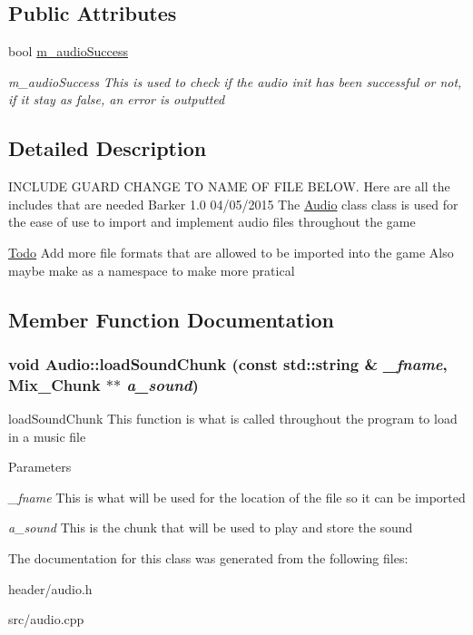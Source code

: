 \subsection*{Public Attributes}
\begin{DoxyCompactItemize}
\item 
\hypertarget{classAudio_a5ce8acaf6d5803f16478dc6aad900eb6}{
bool \hyperlink{classAudio_a5ce8acaf6d5803f16478dc6aad900eb6}{m\_\-audioSuccess}}
\label{classAudio_a5ce8acaf6d5803f16478dc6aad900eb6}

\begin{DoxyCompactList}\small\item\em m\_\-audioSuccess This is used to check if the audio init has been successful or not, if it stay as false, an error is outputted \item\end{DoxyCompactList}\end{DoxyCompactItemize}


\subsection{Detailed Description}
INCLUDE GUARD CHANGE TO NAME OF FILE BELOW. Here are all the includes that are needed  Barker  1.0 04/05/2015 The \hyperlink{classAudio}{Audio} class  class is used for the ease of use to import and implement audio files throughout the game \begin{Desc}
\item[\hyperlink{todo__todo000002}{Todo}]Add more file formats that are allowed to be imported into the game Also maybe make as a namespace to make more pratical \end{Desc}


\subsection{Member Function Documentation}
\hypertarget{classAudio_a24c2a5a06eb70cf15028b71f78fe869d}{
\subsubsection[{loadSoundChunk}]{\setlength{\rightskip}{0pt plus 5cm}void Audio::loadSoundChunk (const std::string \& {\em \_\-fname}, \/  Mix\_\-Chunk $\ast$$\ast$ {\em a\_\-sound})}}
\label{classAudio_a24c2a5a06eb70cf15028b71f78fe869d}


loadSoundChunk This function is what is called throughout the program to load in a music file 
\begin{DoxyParams}{Parameters}
\item[{\em \_\-fname}]This is what will be used for the location of the file so it can be imported \item[{\em a\_\-sound}]This is the chunk that will be used to play and store the sound \end{DoxyParams}


The documentation for this class was generated from the following files:\begin{DoxyCompactItemize}
\item 
header/audio.h\item 
src/audio.cpp\end{DoxyCompactItemize}
